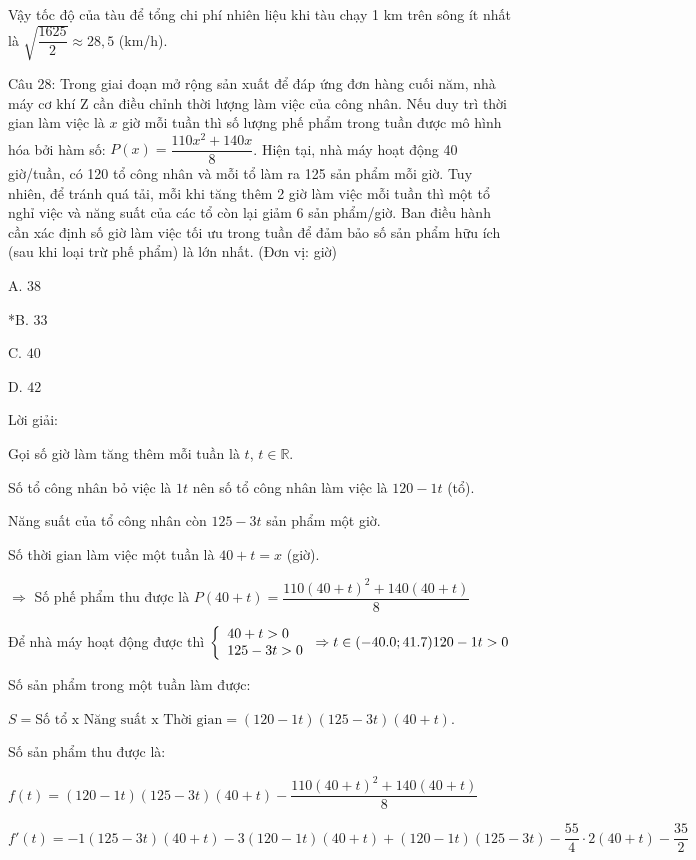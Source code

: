 \documentclass[a4paper,12pt]{article}
\begin{document}
        Vậy tốc độ của tàu để tổng chi phí nhiên liệu khi tàu chạy 1 km trên sông ít nhất là \(\sqrt{\dfrac{1625}{2}} \approx 28,5\) (km/h).




Câu 28: Trong giai đoạn mở rộng sản xuất để đáp ứng đơn hàng cuối năm, nhà máy cơ khí Z cần điều chỉnh thời lượng làm việc của công nhân. Nếu duy trì thời gian làm việc là \(x\) giờ mỗi tuần thì số lượng phế phẩm trong tuần được mô hình hóa bởi hàm số: \( P(x) = \dfrac{110x^2 + 140x}{8} \). Hiện tại, nhà máy hoạt động 40 giờ/tuần, có 120 tổ công nhân và mỗi tổ làm ra 125 sản phẩm mỗi giờ. Tuy nhiên, để tránh quá tải, mỗi khi tăng thêm 2 giờ làm việc mỗi tuần thì một tổ nghỉ việc và năng suất của các tổ còn lại giảm 6 sản phẩm/giờ. Ban điều hành cần xác định số giờ làm việc tối ưu trong tuần để đảm bảo số sản phẩm hữu ích (sau khi loại trừ phế phẩm) là lớn nhất. (Đơn vị: giờ)

A. \(38\)

*B. \(33\)

C. \(40\)

D. \(42\)

Lời giải:


Gọi số giờ làm tăng thêm mỗi tuần là \(t\), \(t \in \mathbb{R}\).

Số tổ công nhân bỏ việc là \(1 t\) nên số tổ công nhân làm việc là \(120 - 1 t\) (tổ).

Năng suất của tổ công nhân còn \(125 - 3 t\) sản phẩm một giờ.

Số thời gian làm việc một tuần là \(40 + t = x\) (giờ).

\(\Rightarrow\) Số phế phẩm thu được là \(P(40 + t) = \dfrac{110(40 + t)^2 + 140(40 + t)}{8}\)

Để nhà máy hoạt động được thì \(\left\{\begin{array}{l}40 + t > 0 \\ 125 - 3 t > 0\end{array}\right. \Rightarrow t \in(-40.0 ; 41.7) \\ 120 - 1 t > 0\)

Số sản phẩm trong một tuần làm được:

\(S = \text{Số tổ x Năng suất x Thời gian} = \left(120 - 1 t\right)\left(125 - 3 t\right)(40 + t)\).

Số sản phẩm thu được là:

\(f(t) = \left(120 - 1 t\right)\left(125 - 3 t\right)(40 + t) - \dfrac{110(40 + t)^2 + 140(40 + t)}{8}\)

\(f'(t) = -1\left(125 - 3 t\right)(40 + t) - 3\left(120 - 1 t\right)(40 + t) + \left(120 - 1 t\right)\left(125 - 3 t\right) - \dfrac{55}{4} \cdot 2(40 + t) - \dfrac{35}{2}\)
\end{document}
